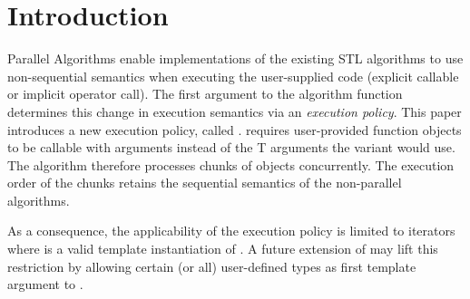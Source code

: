 \section{Introduction}

Parallel Algorithms enable implementations of the existing STL algorithms to use non-sequential semantics when executing the user-supplied code (explicit callable or implicit operator call).
The first argument to the algorithm function determines this change in execution semantics via an \emph{execution policy}.
This paper introduces a new execution policy, called \dataparEP.
\dataparEP requires user-provided function objects to be callable with \datapar[<T, Abi>] arguments instead of the \type T arguments the \seqEP variant would use.
The algorithm therefore processes chunks of  objects concurrently.
The execution order of the chunks retains the sequential semantics of the non-parallel algorithms.

As a consequence, the applicability of the execution policy is limited to iterators where  is a valid template instantiation of \datapar.
A future extension of \datapar may lift this restriction by allowing certain (or all) user-defined types as first template argument to \datapar.

